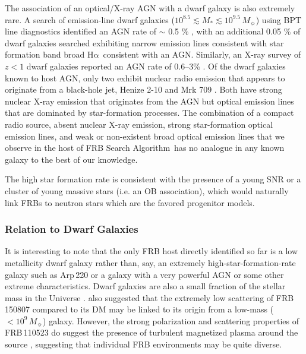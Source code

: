 \documentclass[twocolumn]{aastex61}
\def \frb {FRB Search Algorithm}
\def \halpha {\ensuremath{\mathrm{H\alpha}}}
\begin{document}
The association of an optical/X-ray AGN with a dwarf galaxy is also extremely rare. A search of emission-line dwarf galaxies ($10^{8.5} \lesssim M_* \lesssim 10^{9.5}\,M_\sun$) using BPT line diagnostics identified an AGN rate of $\sim$ 0.5 \% \citep{rgg13}, with an additional 0.05 \% of dwarf galaxies searched exhibiting narrow emission lines consistent with star formation band broad \halpha\ consistent with an AGN. Similarly, an X-ray survey of $z<1$ dwarf galaxies reported an AGN rate of 0.6--3\% \citep{pgg+16}. Of the dwarf galaxies known to host AGN, only two exhibit nuclear radio emission that appears to originate from a black-hole jet, Henize 2-10 and Mrk 709 \citep{rsjb11,rpr+14}.  Both have strong nuclear X-ray emission that originates from the AGN but optical emission lines that are dominated by star-formation processes. The combination of a compact radio source, absent nuclear X-ray emission, strong star-formation optical emission lines, and weak or non-existent broad optical emission lines that we observe in the host of \frb\ has no analogue in any known galaxy to the best of our knowledge. 

The high star formation rate is consistent with the presence of a young SNR or a cluster of young massive stars (i.e. an OB association), which would naturally link FRBs to neutron stars which are the favored progenitor models.


\subsubsection{Relation to Dwarf Galaxies}
It is interesting to note that the only FRB host directly identified so far is a low metallicity dwarf galaxy rather than, say, an extremely high-star-formation-rate galaxy such as Arp\,220 or a galaxy with a very powerful AGN or some other extreme characteristics. Dwarf galaxies are also a small fraction of the stellar mass in the Universe \citep{pch+12}. \citet{rsb+16} also suggested that the extremely low scattering of FRB\,150807 compared to its DM may be linked to its origin from a low-mass ($<10^{9}\,M_\sun$) galaxy. However, the strong polarization and scattering properties of FRB\,110523 do suggest the presence of turbulent magnetized plasma around the source \citep{mls+15}, suggesting that individual FRB environments may be quite diverse.



\end{document}
